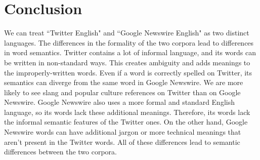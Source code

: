 \documentclass[11pt,a4paper]{article}
\begin{document}
\section{Conclusion}
We can treat ``Twitter English" and ``Google Newswire English" as two distinct languages. The differences in the formality of the two corpora lead to differences in word semantics. Twitter contains a lot of informal language, and its words can be written in non-standard ways. This creates ambiguity and adds meanings to the improperly-written words. Even if a word is correctly spelled on Twitter, its semantics can diverge from the same word in Google Newswire. We are more likely to see slang and popular culture references on Twitter than on Google Newswire. Google Newswire also uses a more formal and standard English language, so its words lack these additional meanings. Therefore, its words lack the informal semantic features of the Twitter ones. On the other hand, Google Newswire words can have additional jargon or more technical meanings that aren't present in the Twitter words. All of these differences lead to semantic differences between the two corpora.
\end{document}
